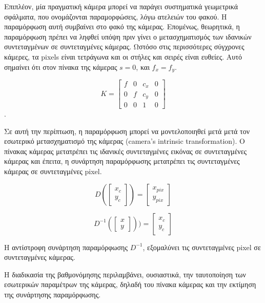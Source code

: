 Επιπλέον, μία πραγματική κάμερα μπορεί να παράγει συστηματικά γεωμετρικά σφάλματα, που ονομάζονται παραμορφώσεις, λόγω ατελειών του φακού. 
Η παραμόρφωση αυτή συμβαίνει στο φακό της κάμερας. 
Επομένως, θεωρητικά, η παραμόρφωση πρέπει να ληφθεί υπόψη πριν γίνει ο μετασχηματισμός των ιδανικών συντεταγμένων σε συντεταγμένες κάμερας. 
Ωστόσο στις περισσότερες σύγχρονες κάμερες, τα pixels είναι τετράγωνα και οι στήλες και σειρές είναι ευθείες. Αυτό σημαίνει ότι στον πίνακα της κάμερας $s=0$, και $f_{x}=f_{y}$.

\begin{equation}
K=
\begin{bmatrix}
f & 0 & c_{x} & 0\\
0 & f & c_{y} & 0\\
0 & 0 & 1 & 0
\end{bmatrix}
\end{equation} .


Σε αυτή την περίπτωση, η παραμόρφωση μπορεί να μοντελοποιηθεί μετά μετά τον εσωτερικό μετασχηματισμό της κάμερας (camera’s intrinsic transformation). Ο πίνακας κάμερας μετατρέπει τις ιδανικές συντεταγμένες εικόνας σε συντεταγμένες κάμερας και έπειτα, η συνάρτηση παραμόρφωσης μετατρέπει τις συντεταγμένες κάμερας σε συντεταγμένες pixel.

\begin{equation}
D
\left(
\begin{bmatrix}
x_{c}\\
y_{c}   
\end{bmatrix}
\right )
=
\begin{bmatrix}
x_{pix}\\
y_{pix}   
\end{bmatrix}
\end{equation} 


\begin{equation}
D^{-1}
\left (
\begin{bmatrix}
x\\
y  
\end{bmatrix}
\right )
)=
\begin{bmatrix}
x_{c}\\
y_{c}
\end{bmatrix}
\end{equation} 


Η αντίστροφη συνάρτηση παραμόρφωσης $D^{-1}$, εξομαλύνει τις συντεταγμένες pixel σε συντεταγμένες κάμερας.




Η διαδικασία της βαθμονόμησης περιλαμβάνει, ουσιαστικά, την ταυτοποίηση των εσωτερικών παραμέτρων της κάμερας, δηλαδή του πίνακα κάμερας και την εκτίμηση της συνάρτησης παραμόρφωσης.


